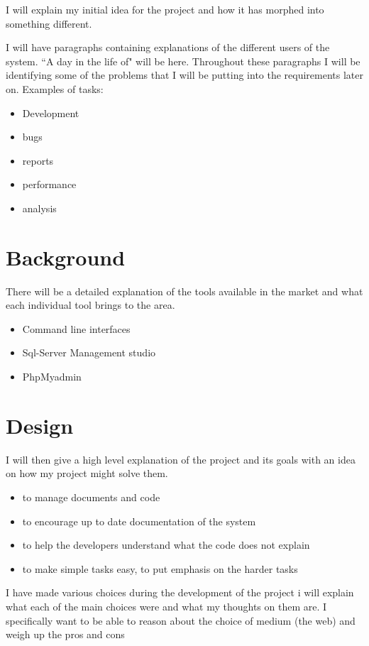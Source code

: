 \documentclass[a4paper, 11pt]{article}
\begin{document}
I will explain my initial idea for the project and how it has morphed into
something different.

I will have paragraphs containing explanations of the different users of the
system. ``A day in the life of" will be here. Throughout these paragraphs I will
be identifying some of the problems that I will be putting into the requirements
later on. Examples of tasks:

\begin{itemize}
  \item{Development}
  \item{bugs}
  \item{reports}
  \item{performance}
  \item{analysis}
\end{itemize}

\section{Background}

There will be a detailed explanation of the tools available in the market
and what each individual tool brings to the area.

\begin{itemize}
  \item{Command line interfaces}
  \item{Sql-Server Management studio}
  \item{PhpMyadmin}
\end{itemize}

\section{Design}

I will then give a high level explanation of the project and its goals with an
idea on how my project might solve them.

\begin{itemize}
  \item{to manage documents and code}
  \item{to encourage up to date documentation of the system}
  \item{to help the developers understand what the code does not explain}
  \item{to make simple tasks easy, to put emphasis on the harder tasks}
\end{itemize}

I have made various choices during the development of the project i will explain
what each of the main choices were and what my thoughts on them are. I
specifically want to be able to reason about the choice of medium (the web) and
weigh up the pros and cons
\end{document}

